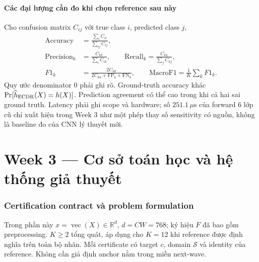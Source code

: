\documentclass[11pt,a4paper]{article}
\newcommand{\R}{\mathbb R}
\newcommand{\vecop}{\operatorname{vec}}
\newcommand{\Sset}{\mathcal S}
\theoremstyle{remark}
\begin{document}
\subsection{Các đại lượng cần đo khi chọn reference sau này}
Cho confusion matrix $C_{ij}$ với true class $i$, predicted class $j$,
\begin{align}
 \mathrm{Accuracy}&=\frac{\sum_i C_{ii}}{\sum_{ij}C_{ij}},\\
 \mathrm{Precision}_k&=\frac{C_{kk}}{\sum_i C_{ik}},\qquad
 \mathrm{Recall}_k=\frac{C_{kk}}{\sum_j C_{kj}},\\
 F1_k&=\frac{2C_{kk}}{2C_{kk}+\mathrm{FP}_k+\mathrm{FN}_k},\qquad
 \mathrm{MacroF1}=\frac1K\sum_kF1_k.
\end{align}
Quy ước denominator 0 phải ghi rõ. Ground-truth accuracy khác
$\Pr[\widehat h_{\rm ECDR}(X)=h(X)]$. Prediction agreement có thể cao trong
khi cả hai sai ground truth. Latency phải ghi scope và hardware; số
$251.1\,\mu$s của forward 6 lớp cũ chỉ xuất hiện trong Week 3 như một phép
thay số sensitivity có nguồn, không là baseline đo của CNN lý thuyết mới.


\clearpage
\part{Week 3 --- Cơ sở toán học và hệ thống giả thuyết}
\section{Certification contract và problem formulation}
Trong phần này $x=\vecop(X)\in\R^d$, $d=CW=768$; ký hiệu $F$ đã bao gồm
preprocessing. $K\ge2$ tổng quát, áp dụng cho $K=12$ khi reference được định
nghĩa trên toàn bộ nhãn. Mỗi certificate có target $c$, domain $\Sset$ và
identity của reference. Không cần giả định anchor nằm trong miền next-wave.
\end{document}
